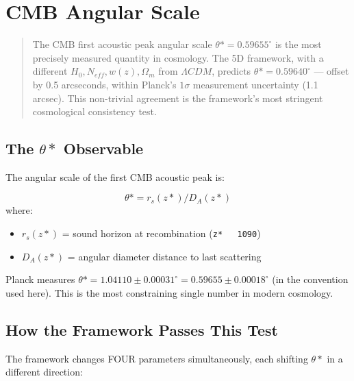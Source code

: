 \documentclass[aps,prd,preprint,superscriptaddress,longbibliography]{revtex4-2}
\begin{document}
\section{CMB Angular Scale}


\begin{quote}
The CMB first acoustic peak angular scale $\theta* = 0.59655^{\circ}$ \cite{Planck2018_VI} is the most precisely measured quantity in cosmology. The
5D framework, with a different ${H_{0}, N_{eff}, w(z), \Omega_m}$ from $\Lambda CDM$,
predicts $\theta* = 0.59640^{\circ}$ --- offset by 0.5 arcseconds, within Planck's
$1\sigma$ measurement uncertainty (1.1 arcsec). This non-trivial agreement
is the framework's most stringent cosmological consistency test.
\end{quote}



\subsection{The $\theta*$ Observable}

The angular scale of the first CMB acoustic peak is:


\begin{equation}
    \theta* = r_s(z*) / D_A(z*)
\end{equation}
where:

\begin{itemize}
  \item $r_s(z*)$ = sound horizon at recombination (\texttt{z* ~ 1090})
  \item $D_A(z*)$ = angular diameter distance to last scattering
\end{itemize}

Planck measures $\theta* = 1.04110 \pm 0.00031^{\circ} = 0.59655 \pm 0.00018^{\circ}$ (in the convention used here). This is the most constraining single number in modern cosmology.



\subsection{How the Framework Passes This Test}

The framework changes FOUR parameters simultaneously, each shifting $\theta*$ in a different direction:
\end{document}
